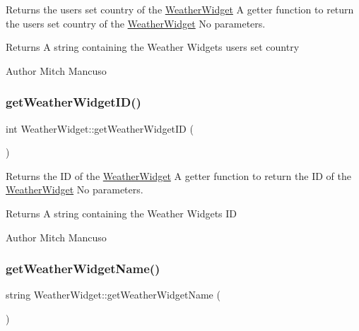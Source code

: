 Returns the user\textquotesingle{}s set country of the \mbox{\hyperlink{class_weather_widget}{Weather\+Widget}}  A getter function to return the user\textquotesingle{}s set country of the \mbox{\hyperlink{class_weather_widget}{Weather\+Widget}}  No parameters. 

\begin{DoxyReturn}{Returns}
A string containing the Weather Widget\textquotesingle{}s user\textquotesingle{}s set country 
\end{DoxyReturn}
\begin{DoxyAuthor}{Author}
Mitch Mancuso 
\end{DoxyAuthor}
\mbox{\label{class_weather_widget_abaa5920ec25ec5981d2c1f347550acf4}} 
\subsubsection{\texorpdfstring{get\+Weather\+Widget\+I\+D()}{getWeatherWidgetID()}}
{\footnotesize\ttfamily int Weather\+Widget\+::get\+Weather\+Widget\+ID (\begin{DoxyParamCaption}{ }\end{DoxyParamCaption})}



Returns the ID of the \mbox{\hyperlink{class_weather_widget}{Weather\+Widget}}  A getter function to return the ID of the \mbox{\hyperlink{class_weather_widget}{Weather\+Widget}}  No parameters. 

\begin{DoxyReturn}{Returns}
A string containing the Weather Widget\textquotesingle{}s ID 
\end{DoxyReturn}
\begin{DoxyAuthor}{Author}
Mitch Mancuso 
\end{DoxyAuthor}
\mbox{\label{class_weather_widget_a5127020f0dd4df0d2d64c7c2a6da2ae5}} 
\subsubsection{\texorpdfstring{get\+Weather\+Widget\+Name()}{getWeatherWidgetName()}}
{\footnotesize\ttfamily string Weather\+Widget\+::get\+Weather\+Widget\+Name (\begin{DoxyParamCaption}{ }\end{DoxyParamCaption})}



